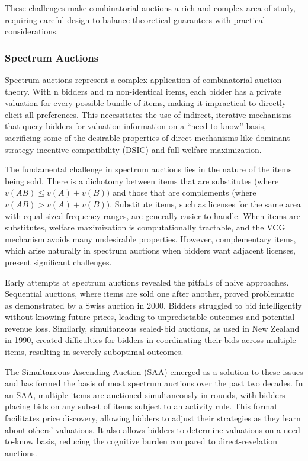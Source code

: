 \documentclass[
  letterpaper,
  DIV=11,
  numbers=noendperiod,
  oneside]{scrreprt}
\theoremstyle{remark}
\begin{document}
These challenges make combinatorial auctions a rich and complex area of
study, requiring careful design to balance theoretical guarantees with
practical considerations.

\subsubsection*{Spectrum Auctions}\label{spectrum-auctions}

Spectrum auctions represent a complex application of combinatorial
auction theory. With n bidders and m non-identical items, each bidder
has a private valuation for every possible bundle of items, making it
impractical to directly elicit all preferences. This necessitates the
use of indirect, iterative mechanisms that query bidders for valuation
information on a ``need-to-know'' basis, sacrificing some of the
desirable properties of direct mechanisms like dominant strategy
incentive compatibility (DSIC) and full welfare maximization.

The fundamental challenge in spectrum auctions lies in the nature of the
items being sold. There is a dichotomy between items that are
substitutes (where \(v(AB) \leq v(A) + v(B))\) and those that are
complements (where \(v(AB) > v(A) + v(B))\). Substitute items, such as
licenses for the same area with equal-sized frequency ranges, are
generally easier to handle. When items are substitutes, welfare
maximization is computationally tractable, and the VCG mechanism avoids
many undesirable properties. However, complementary items, which arise
naturally in spectrum auctions when bidders want adjacent licenses,
present significant challenges.

Early attempts at spectrum auctions revealed the pitfalls of naive
approaches. Sequential auctions, where items are sold one after another,
proved problematic as demonstrated by a Swiss auction in 2000. Bidders
struggled to bid intelligently without knowing future prices, leading to
unpredictable outcomes and potential revenue loss. Similarly,
simultaneous sealed-bid auctions, as used in New Zealand in 1990,
created difficulties for bidders in coordinating their bids across
multiple items, resulting in severely suboptimal outcomes.

The Simultaneous Ascending Auction (SAA) emerged as a solution to these
issues and has formed the basis of most spectrum auctions over the past
two decades. In an SAA, multiple items are auctioned simultaneously in
rounds, with bidders placing bids on any subset of items subject to an
activity rule. This format facilitates price discovery, allowing bidders
to adjust their strategies as they learn about others' valuations. It
also allows bidders to determine valuations on a need-to-know basis,
reducing the cognitive burden compared to direct-revelation auctions.
\end{document}
